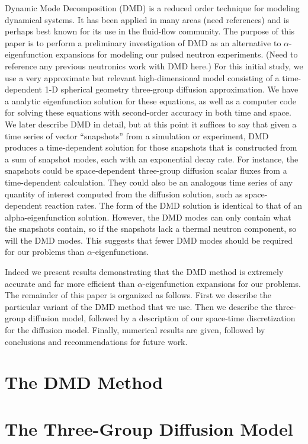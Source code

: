 \documentclass[12pt]{article}
\begin{document}
Dynamic Mode Decomposition (DMD) is a reduced order technique for modeling dynamical systems.  It has been applied 
in many areas (need references) and is perhaps best known for its use in the fluid-flow community.  The purpose of 
this paper is to perform a preliminary investigation of DMD as an alternative to $\alpha$-eigenfunction expansions 
for modeling our pulsed neutron experiments. (Need to reference any previous neutronics work with DMD here.) 
For this initial study, we use a very approximate but relevant 
high-dimensional model consisting of a time-dependent 1-D spherical geometry three-group diffusion approximation. 
We have a analytic eigenfunction solution for these equations, as well as a computer code for solving 
these equations with second-order accuracy in both time and space.  We later describe DMD in detail, but at 
this point it suffices to say that given a time series of vector ``snapshots'' from a simulation or experiment, 
DMD produces a time-dependent solution for those snapshots that is constructed from a sum of snapshot modes, each with 
an exponential decay rate.  For instance, the snapshots could be space-dependent three-group diffusion scalar fluxes 
from a time-dependent calculation.  They could also be an analogous time series of any quantity of interest computed 
from the diffusion solution, such as space-dependent reaction rates.  The form of the DMD solution is identical to that 
of an alpha-eigenfunction solution.  However, the DMD modes can only contain what the snapshots contain, so if the snapshots 
lack a thermal neutron component, so will the DMD modes.  This suggests that fewer DMD modes should be required for 
our problems than $\alpha$-eigenfunctions.

Indeed we present results demonstrating that the DMD method is extremely accurate and far more efficient than 
$\alpha$-eigenfunction expansions for our problems.  The remainder of this paper is organized as follows.  First we describe 
the particular variant of the DMD method that we use.  Then we describe the three-group diffusion model, followed by a 
description of our space-time discretization for the diffusion model.  Finally, numerical results are given, followed by 
conclusions and recommendations for future work.


\section{The DMD Method}

\section{The Three-Group Diffusion Model}
\end{document}
